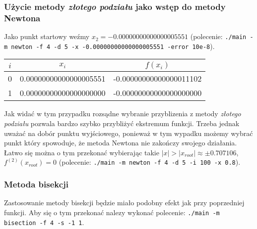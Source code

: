 \documentclass[a4paper,11pt]{article}
\begin{document}
  \subsubsection{Użycie metody \emph{złotego podziału} jako wstęp do metody Newtona}
  Jako punkt startowy weźmy $ x_2 = -0.00000000000000005551 $ (polecenie: \texttt{./main -m newton -f 4 -d 5 -x -0.00000000000000005551 -error 10e-8}).
  \begin{center}
      \begin{tabular}{S[table-format=1.0]S[table-format=-1.9]S[table-format=-1.15,table-auto-round=false]}
        \toprule
        {$i$}                & {$x_i$}               & {$f(x_i)$}            \\  & 0.00000000000000005551 & -0.00000000000000011102 \\
          1 & 0.00000000000000000000 & -0.00000000000000000000 \\ \bottomrule
        \end{tabular}
    \end{center}
      Jak widać w tym przypadku rozsądne wybranie przyblizenia z metody \emph{złotego podziału} pozwala bardzo szybko przybliżyć ekstremum funkcji. Trzeba jednak uważać na dobór punktu wyjściowego, ponieważ w tym wypadku możemy wybrać punkt który spowoduje, że metoda Newtona nie zakończy swojego działania. Łatwo się można o tym przekonać wybierając takie $ |x| > |x_{root}| \approx \pm 0.707106 $, $ f^{(2)}(x_{root}) = 0 $ (polecenie: \texttt{./main -m newton -f 4 -d 5 -i 100 -x 0.8}).
      
  \subsubsection{Metoda bisekcji}
  Zastosowanie metody bisekcji będzie miało podobny efekt jak przy poprzedniej funkcji. Aby się o tym przekonać nalezy wykonać polecenie: \texttt{./main -m bisection -f 4 -s -1 1}.
  
\end{document}

